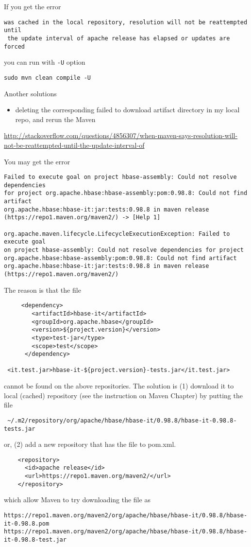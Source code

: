 If you get the error
\begin{verbatim}
was cached in the local repository, resolution will not be reattempted until
 the update interval of apache release has elapsed or updates are forced 
\end{verbatim}
you can run with \verb!-U! option 
\begin{verbatim}
sudo mvn clean compile -U
\end{verbatim}
Another solutions
\begin{itemize}
  \item  deleting the corresponding failed to download artifact directory in my
  local repo, and rerun the Maven
\end{itemize}
\url{http://stackoverflow.com/questions/4856307/when-maven-says-resolution-will-not-be-reattempted-until-the-update-interval-of}


You may get the error
\begin{verbatim}
Failed to execute goal on project hbase-assembly: Could not resolve dependencies
for project org.apache.hbase:hbase-assembly:pom:0.98.8: Could not find artifact
org.apache.hbase:hbase-it:jar:tests:0.98.8 in maven release (https://repo1.maven.org/maven2/) -> [Help 1]  

org.apache.maven.lifecycle.LifecycleExecutionException: Failed to execute goal
on project hbase-assembly: Could not resolve dependencies for project 
org.apache.hbase:hbase-assembly:pom:0.98.8: Could not find artifact
org.apache.hbase:hbase-it:jar:tests:0.98.8 in maven release
(https://repo1.maven.org/maven2/)   
\end{verbatim}
The reason is that the file
\begin{verbatim}
     <dependency>
        <artifactId>hbase-it</artifactId>
        <groupId>org.apache.hbase</groupId>
        <version>${project.version}</version>
        <type>test-jar</type>
        <scope>test</scope>
      </dependency>

 <it.test.jar>hbase-it-${project.version}-tests.jar</it.test.jar> 
\end{verbatim}
cannot be found on the above repositories. The solution is (1) download it to
local (cached) repository (see the instruction on Maven Chapter) by putting the file
\begin{verbatim}
 ~/.m2/repository/org/apache/hbase/hbase-it/0.98.8/hbase-it-0.98.8-tests.jar
\end{verbatim}
or, (2) add a new repository that has the file to pom.xml. 
\begin{verbatim}
    <repository>
      <id>apache release</id>
      <url>https://repo1.maven.org/maven2/</url>
    </repository>
\end{verbatim}
which allow Maven to try downloading the file as
\begin{verbatim}
https://repo1.maven.org/maven2/org/apache/hbase/hbase-it/0.98.8/hbase-it-0.98.8.pom
https://repo1.maven.org/maven2/org/apache/hbase/hbase-it/0.98.8/hbase-it-0.98.8-test.jar
\end{verbatim}

